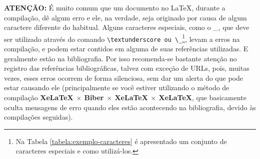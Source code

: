 \textbf{ATENÇÃO:} É muito comum que um documento no \LaTeX{}, durante a compilação, dê algum erro e ele, na verdade, seja originado por causa de algum caractere diferente do habitual. Alguns caracteres especiais, como o \_, que deve ser utilizado através do comando \verb|\textunderscore ou \_|\footnote{Na Tabela \ref{tabela:exemplo-caracteres} é apresentado um conjunto de caracteres especiais e como utilizá-los.}, levam a erros na compilação, e podem estar contidos em alguma de suas referências utilizadas. E geralmente estão na bibliografia. Por isso recomenda-se bastante atenção no registro das referências bibliográficas, talvez com exceção de URLs, pois, muitas vezes, esses erros ocorrem de forma silenciosa, sem dar um alerta do que pode estar causando ele (principalmente se você estiver utilizando o método de compilação \textbf{XeLaTeX $\times$ Biber $\times$ XeLaTeX $\times$ XeLaTeX}, que basicamente oculta mensagens de erro quando eles estão acontecendo na bibliografia, devido às compilações seguidas).
